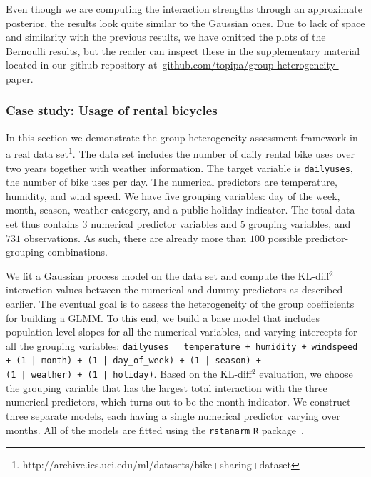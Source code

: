 \documentclass{article}
\begin{document}
Even though we are computing the interaction strengths through an approximate posterior, the results look quite similar to the Gaussian ones.
%
Due to lack of space and similarity with the previous results, we have omitted the plots of the Bernoulli
results, but the reader can inspect these in the supplementary material located in our github repository
at~\href{https://github.com/topipa/group-heterogeneity-paper}{github.com/topipa/group-heterogeneity-paper}.
%

\subsubsection{Case study: Usage of rental bicycles} \label{sec:bikedata}

%
%
%
%
%
%
%
%
%
%
%
%
%
%

In this section we demonstrate the group heterogeneity assessment framework in a real data set\footnote{http://archive.ics.uci.edu/ml/datasets/bike+sharing+dataset}. The data set
includes the number of daily rental bike uses over two years together with weather information.
The target variable is \texttt{dailyuses}, the number of bike uses per day.
The numerical predictors are temperature, humidity, and wind speed.
We have five grouping variables:
day of the week, month, season, weather category, and a public holiday indicator.
%
%
%
%
%
%
The total data set thus contains  $3$ numerical predictor
variables and $5$ grouping variables, and $731$ observations.
As such, there are already more than $100$ possible predictor-grouping combinations.
%



%
%
%
%
%
%
%
%
%
%
%
%
%
%




We fit a Gaussian process model on the data set and compute the KL-diff$^2$ interaction values between
the numerical and dummy predictors as described earlier.
The eventual goal is to assess the heterogeneity
of the group coefficients for building a GLMM.
%
%
%
To this end, we build
a base model that includes population-level slopes for all the numerical
variables, and varying intercepts for all the grouping variables:
\texttt{dailyuses \texttildelow \, temperature + humidity + windspeed + (1 | month) + (1 | day\_of\_week) + (1 | season) +\\ (1 | weather) + (1 | holiday)}.
Based on the KL-diff$^2$ evaluation, we choose the grouping variable that has the largest total interaction with
the three numerical predictors, which turns out to be the month indicator.
We construct three separate models, each having a single numerical predictor varying over months.
All of the models are fitted using the \texttt{rstanarm} \texttt{R} package~\cite{rstanarm}.
%
%
%
\end{document}
